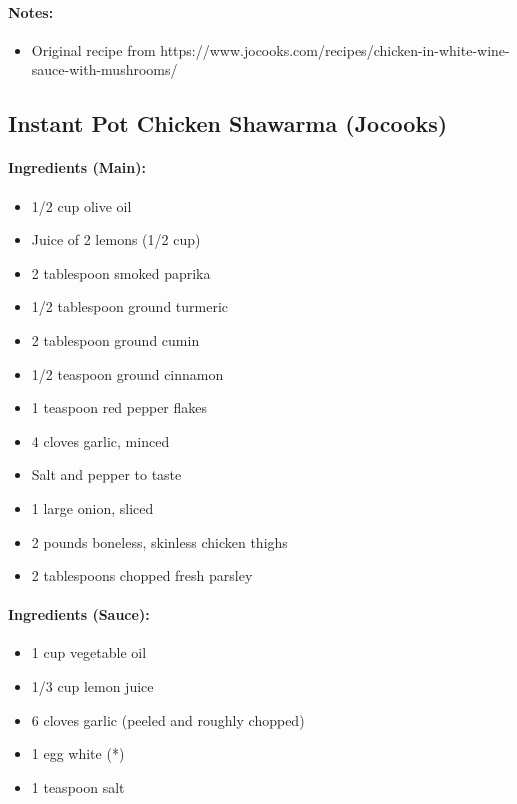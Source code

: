 \documentclass{article}
\begin{document}
\paragraph{Notes:}
\begin{itemize}
    \item Original recipe from https://www.jocooks.com/recipes/chicken-in-white-wine-sauce-with-mushrooms/
\end{itemize}

\subsection{Instant Pot Chicken Shawarma (Jocooks)} 

\paragraph{Ingredients (Main):}
\begin{itemize}
    \item 1/2 cup olive oil
    \item Juice of 2 lemons (1/2 cup)
    \item 2 tablespoon smoked paprika
    \item 1/2 tablespoon ground turmeric
    \item 2 tablespoon ground cumin
    \item 1/2 teaspoon ground cinnamon
    \item 1 teaspoon red pepper flakes
    \item 4 cloves garlic, minced
    \item Salt and pepper to taste
    \item 1 large onion, sliced
    \item 2 pounds boneless, skinless chicken thighs
    \item 2 tablespoons chopped fresh parsley
\end{itemize}  

\paragraph{Ingredients (Sauce):}
\begin{itemize}
    \item 1 cup vegetable oil
    \item 1/3 cup lemon juice
    \item 6 cloves garlic (peeled and roughly chopped)
    \item 1 egg white (*)
    \item 1 teaspoon salt
\end{itemize}  
\end{document}
